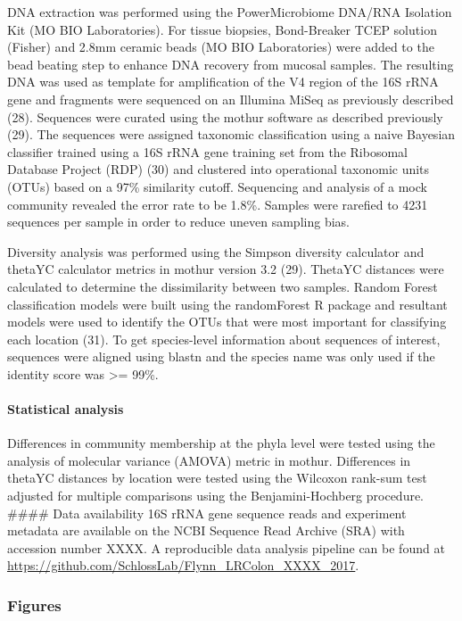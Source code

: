 \documentclass[11pt,]{article}
\let\oldparagraph\paragraph
\renewcommand{\paragraph}[1]{\oldparagraph{#1}\mbox{}}
\begin{document}
DNA extraction was performed using the PowerMicrobiome DNA/RNA Isolation
Kit (MO BIO Laboratories). For tissue biopsies, Bond-Breaker TCEP
solution (Fisher) and 2.8mm ceramic beads (MO BIO Laboratories) were
added to the bead beating step to enhance DNA recovery from mucosal
samples. The resulting DNA was used as template for amplification of the
V4 region of the 16S rRNA gene and fragments were sequenced on an
Illumina MiSeq as previously described (28). Sequences were curated
using the mothur software as described previously (29). The sequences
were assigned taxonomic classification using a naive Bayesian classifier
trained using a 16S rRNA gene training set from the Ribosomal Database
Project (RDP) (30) and clustered into operational taxonomic units (OTUs)
based on a 97\% similarity cutoff. Sequencing and analysis of a mock
community revealed the error rate to be 1.8\%. Samples were rarefied to
4231 sequences per sample in order to reduce uneven sampling bias.

Diversity analysis was performed using the Simpson diversity calculator
and thetaYC calculator metrics in mothur version 3.2 (29). ThetaYC
distances were calculated to determine the dissimilarity between two
samples. Random Forest classification models were built using the
randomForest R package and resultant models were used to identify the
OTUs that were most important for classifying each location (31). To get
species-level information about sequences of interest, sequences were
aligned using blastn and the species name was only used if the identity
score was \textgreater{}= 99\%.

\paragraph{Statistical analysis}\label{statistical-analysis}

Differences in community membership at the phyla level were tested using
the analysis of molecular variance (AMOVA) metric in mothur. Differences
in thetaYC distances by location were tested using the Wilcoxon rank-sum
test adjusted for multiple comparisons using the Benjamini-Hochberg
procedure. \#\#\#\# Data availability 16S rRNA gene sequence reads and
experiment metadata are available on the NCBI Sequence Read Archive
(SRA) with accession number XXXX. A reproducible data analysis pipeline
can be found at
\url{https://github.com/SchlossLab/Flynn_LRColon_XXXX_2017}.

\newpage

\subsubsection{Figures}\label{figures}
\end{document}
